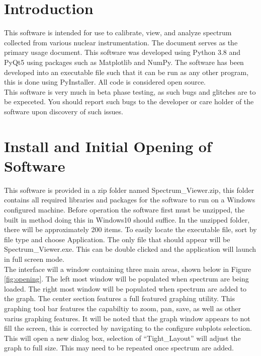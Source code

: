 \section{Introduction}
This software is intended for use to calibrate, view, and analyze spectrum collected from various nuclear instrumentation. The document serves as the primary usage document. This software was developed using Python 3.8 and PyQt5 using packages such as Matplotlib and NumPy. The software has been developed into an executable file such that it can be run as any other program, this is done using PyInstaller. All code is considered open source. \\

This software is very much in beta phase testing, as such bugs and glitches are to be expeceted. You should report such bugs to the developer or care holder of the software upon discovery of such issues.

\section{Install and Initial Opening of Software}
This software is provided in a zip folder named Spectrum\_Viewer.zip, this folder contains all required libraries and packages for the software to run on a Windows configured machine. Before operation the software first must be unzipped, the built in method doing this in Windows10 should suffice. In the unzipped folder, there will be approximately 200 items. To easily locate the executable file, sort by file type and choose Application. The only file that should appear will be Spectrum\_Viewer.exe. This can be double clicked and the application will launch in full screen mode. \\

The interface will a window containing three main areas, shown below in Figure \ref{fig:opening}. The left most window will be populated when spectrum are being loaded. The right most window will be populated when spectrum are added to the graph. The center section features a full featured graphing utility. This graphing tool bar features the capabiltiy to zoom, pan, save, as well as other varius graphing features. It will be noted that the graph window appears to not fill the screen, this is corrected by navigating to the configure subplots selection. This will open a new dialog box, selection of ``Tight\_Layout'' will adjust the graph to full size. This may need to be repeated once spectrum are added. 

